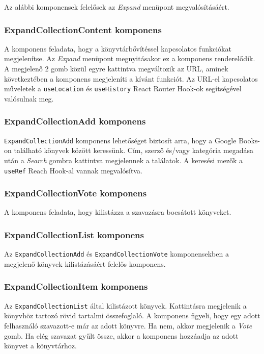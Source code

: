 Az alábbi komponensek felelősek az \textit{Expand} menüpont megvalósításáért.

\subsubsection{ExpandCollectionContent komponens}

A komponens feladata, hogy a könyvtárbővítéssel kapcsolatos funkciókat megjelenítse. Az \textit{Expand} menüpont megnyitásakor ez a komponens renderelődik. A megjelenő 2 gomb közül egyre kattintva megváltozik az URL, aminek következtében a komponens megjeleníti a kívánt funkciót. Az URL-el kapcsolatos műveletek a \texttt{useLocation} és \texttt{useHistory} React Router Hook-ok segítségével valósulnak meg.

\subsubsection{ExpandCollectionAdd komponens}

\texttt{ExpandCollectionAdd} komponens lehetőséget biztosít arra, hogy a Google Books-on található könyvek között keressünk. Cím, szerző és/vagy kategória megadása után a \textit{Search} gombra kattintva megjelennek a találatok. A keresési mezők a \texttt{useRef} Reach Hook-al vannak megvalósítva.

\subsubsection{ExpandCollectionVote komponens}

A komponens feladata, hogy kilistázza a szavazásra bocsátott könyveket.

\subsubsection{ExpandCollectionList komponens}

Az \texttt{ExpandCollectionAdd} és \texttt{ExpandCollectionVote} komponensekben a megjelenő könyvek kilistázásáért felelős komponens.

\subsubsection{ExpandCollectionItem komponens}

Az \texttt{ExpandCollectionList} által kilistázott könyvek. Kattintásra megjelenik a könyvhöz tartozó rövid tartalmi összefoglaló. A komponens figyeli, hogy egy adott felhasználó szavazott-e már az adott könyvre. Ha nem, akkor megjelenik a \textit{Vote} gomb. Ha elég szavazat gyűlt össze, akkor a komponens hozzáadja az adott könyvet a könyvtárhoz. 

